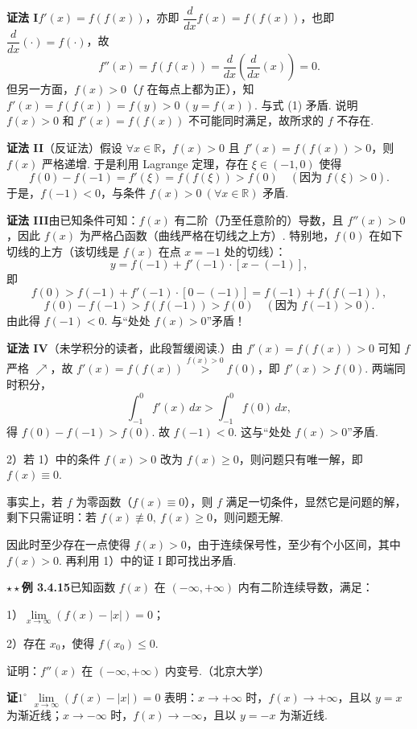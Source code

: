 \documentclass[UTF8, 12pt, fontset=fandol, oneside]{ctexart}
\begin{document}
\noindent\textbf{证法 I}\quad $f'(x)=f(f(x))$，亦即 $\dfrac{d}{dx}f(x)=f(f(x))$，也即 $\dfrac{d}{dx}(\cdot)=f(\cdot)$，故
\[
  f''(x)=f(f(x))=\frac{d}{dx}\left(\frac{d}{dx}(x)\right)=0. \tag{1}
\]
但另一方面，$f(x)>0$（$f$ 在每点上都为正），知 $f'(x)=f(f(x))=f(y)>0\ (y=f(x))$. 与式 (1) 矛盾. 说明 $f(x)>0$ 和 $f'(x)=f(f(x))$ 不可能同时满足，故所求的 $f$ 不存在.

\noindent\textbf{证法 II}\quad （反证法）假设 $\forall x\in\mathbb R$，$f(x)>0$ 且 $f'(x)=f(f(x))>0$，则 $f(x)$ 严格递增. 于是利用 Lagrange 定理，存在 $\xi\in(-1,0)$ 使得
\[
  f(0)-f(-1)=f'(\xi)=f(f(\xi))>f(0)\quad(\text{因为 }f(\xi)>0).
\]
于是，$f(-1)<0$，与条件 $f(x)>0\ (\forall x\in\mathbb R)$ 矛盾.

\noindent\textbf{证法 III}\quad 由已知条件可知：$f(x)$ 有二阶（乃至任意阶的）导数，且 $f''(x)>0$，因此 $f(x)$ 为严格凸函数（曲线严格在切线之上方）. 特别地，$f(0)$ 在如下切线的上方（该切线是 $f(x)$ 在点 $x=-1$ 处的切线）：
\[
  y=f(-1)+f'(-1)\cdot[x-(-1)],
\]
即
\[
  f(0)>f(-1)+f'(-1)\cdot[0-(-1)]
  =f(-1)+f(f(-1)),
\]
\[
  f(0)-f(-1)>f(f(-1))>f(0)\quad(\text{因为 }f(-1)>0).
\]
由此得 $f(-1)<0$. 与“处处 $f(x)>0$”矛盾！

\noindent\textbf{证法 IV}\quad （未学积分的读者，此段暂缓阅读.）由 $f'(x)=f(f(x))>0$ 可知 $f$ 严格 $\nearrow$，故 $f'(x)=f(f(x))\overset{f(x)>0}{>}f(0)$，即 $f'(x)>f(0)$. 两端同时积分，
\[
  \int_{-1}^0 f'(x)\,dx>\int_{-1}^0 f(0)\,dx,
\]
得 $f(0)-f(-1)>f(0)$. 故 $f(-1)<0$. 这与“处处 $f(x)>0$”矛盾.

2）若 1）中的条件 $f(x)>0$ 改为 $f(x)\ge0$，则问题只有唯一解，即 $f(x)\equiv0$.

事实上，若 $f$ 为零函数（$f(x)\equiv0$），则 $f$ 满足一切条件，显然它是问题的解，剩下只需证明：若 $f(x)\not\equiv0,\ f(x)\ge0$，则问题无解.

因此时至少存在一点使得 $f(x)>0$，由于连续保号性，至少有个小区间，其中 $f(x)>0$. 再利用 1）中的证 I 即可找出矛盾.

\noindent\textbf{$\star\star$例 3.4.15}\quad 已知函数 $f(x)$ 在 $(-\infty,+\infty)$ 内有二阶连续导数，满足：

1）$\lim\limits_{x\to\infty}(f(x)-|x|)=0$；

2）存在 $x_0$，使得 $f(x_0)\le0$.

证明：$f''(x)$ 在 $(-\infty,+\infty)$ 内变号.（北京大学）

\noindent\textbf{证}\quad $1^\circ$ $\lim\limits_{x\to\infty}(f(x)-|x|)=0$ 表明：$x\to+\infty$ 时，$f(x)\to+\infty$，且以 $y=x$ 为渐近线；$x\to-\infty$ 时，$f(x)\to-\infty$，且以 $y=-x$ 为渐近线.
\end{document}
